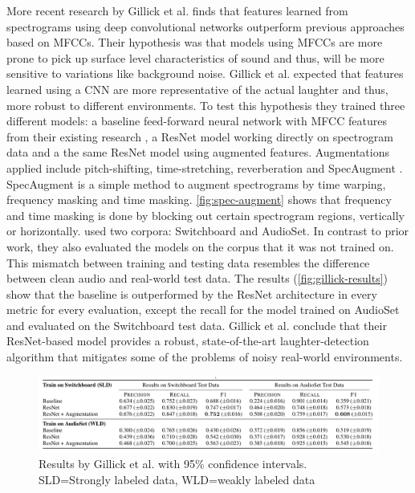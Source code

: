 \documentclass[bsc,frontabs,parskip,deptreport]{infthesis}
\begin{document}
More recent research by Gillick et al. \citep{gillick2021robust} finds that features learned from spectrograms using deep convolutional networks outperform previous approaches based on MFCCs.
Their hypothesis was that models using MFCCs are more prone to pick up surface level characteristics of sound and thus, will be more sensitive to variations like background noise.
Gillick et al. expected that features learned using a CNN are more representative of the actual laughter and thus, more robust to different environments. 
To test this hypothesis they trained three different models: a baseline feed-forward neural network with MFCC features from their existing research \citep{ryokai2018capturing}, a ResNet model working directly on spectrogram data and a the same ResNet model using augmented features. Augmentations applied include pitch-shifting, time-stretching, reverberation and SpecAugment \citep{park2019specaugment}. SpecAugment is a simple method to augment spectrograms by time warping, frequency masking and time masking. \autoref{fig:spec-augment} shows that frequency and time masking is done by blocking out certain spectrogram regions, vertically or horizontally. 
\citeauthor{gillick2021robust} used two corpora: Switchboard \citep{switchboard-corpus} and AudioSet.
In contrast to prior work, they also evaluated the models on the corpus that it was not trained on.
This mismatch between training and testing data resembles the difference between clean audio and real-world test data.
The results (\autoref{fig:gillick-results}) show that the baseline is outperformed by the ResNet architecture in every metric for every evaluation, except the recall for the model trained on AudioSet and evaluated on the Switchboard test data. 
Gillick et al. conclude that their ResNet-based model provides a robust, state-of-the-art laughter-detection algorithm that mitigates some of the problems of noisy real-world environments.

\begin{figure}
    \centering
    \includegraphics[width=14cm]{imgs/results/gillick_et_al.png}
    \caption{Results by Gillick et al. with 95\% confidence intervals. SLD=Strongly labeled data, WLD=weakly labeled data}
    \label{fig:gillick-results}
\end{figure}
\end{document}
